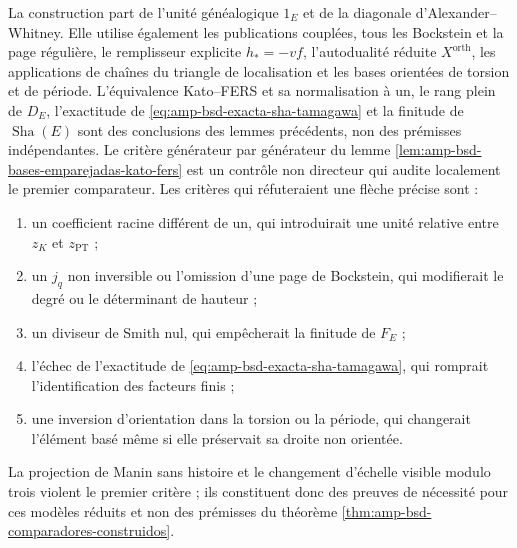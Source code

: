 La construction part de l'unité généalogique \(1_E\) et de la diagonale
d'Alexander--Whitney. Elle utilise également les
publications couplées, tous les
Bockstein et la page régulière, le remplisseur explicite \(h_*=-vf\),
l'autodualité réduite \(X^{\mathrm{orth}}\), les applications de chaînes du
triangle de localisation et les bases orientées de torsion et de période. L'équivalence
Kato--FERS et sa normalisation à un, le rang plein de \(D_E\),
l'exactitude de \eqref{eq:amp-bsd-exacta-sha-tamagawa} et la finitude de
\(\operatorname{Sha}(E)\) sont des conclusions des lemmes précédents, non des
prémisses indépendantes. Le critère générateur par générateur du lemme
\ref{lem:amp-bsd-bases-emparejadas-kato-fers} est un contrôle non directeur
qui audite localement le premier comparateur. Les critères qui réfuteraient une flèche précise
sont :
\begin{enumerate}
 \item un coefficient racine différent de un, qui introduirait une unité
       relative entre \(z_K\) et \(z_{\mathrm{PT}}\) ;
 \item un \(j_q\) non inversible ou l'omission d'une page de Bockstein, qui
       modifierait le degré ou le déterminant de hauteur ;
 \item un diviseur de Smith nul, qui empêcherait la finitude de \(F_E\) ;
 \item l'échec de l'exactitude de
       \eqref{eq:amp-bsd-exacta-sha-tamagawa}, qui romprait l'identification
       des facteurs finis ;
 \item une inversion d'orientation dans la torsion ou la période, qui changerait
       l'élément basé même si elle préservait sa droite non orientée.
\end{enumerate}
La projection de Manin sans histoire et le changement d'échelle visible modulo trois
violent le premier critère ; ils constituent donc des preuves de nécessité pour
ces modèles réduits et non des prémisses du théorème
\ref{thm:amp-bsd-comparadores-construidos}.
